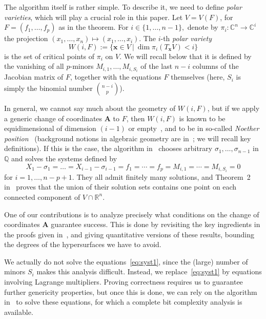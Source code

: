 \documentclass[12pt]{article}
\def\mA{{\bm A}}
\def\xb{{\bm x}}
\def\C{\mathbb{C}}
\def\Q{\mathbb{Q}}
\def\R{\mathbb{R}}
\begin{document}
The algorithm itself is rather simple. To describe it, we need to
define {\em polar varieties}, which will play a crucial role in this
paper. Let $V=V(F)$, for $F=(f_1,\dots,f_p)$ as in the theorem. For $i
\in \{1,\hdots,n-1\},$ denote by $\pi_i:\C^n \rightarrow \C^i$ the
projection $(x_1,\hdots,x_n) \mapsto (x_1,\hdots,x_i)$.  The $i$-th
\textit{polar variety} \[W(i,F) := \{\xb \in V~|~\dim \pi_i(T_\xb
V) < i\}\] is the set of critical points of $\pi_i$ on $V$.  We will
recall below that it is defined by the vanishing of all $p$-minors
$M_{i,1},\dots,M_{i,S_i}$ of the last $n-i$ columns of the Jacobian
matrix of $F$, together with the equations $F$ themselves (here, $S_i$
is simply the binomial number $\binom{n-i}{p}$).

In general, we cannot say much about the geometry of $W(i,F)$, but if
we apply a generic change of coordinates $\mA$ to $F$, then $W(i,F)$
is known to be equidimensional of dimension $(i-1)$ or
empty~\cite{BaGiHeMb97,BaGiHeSaSh10,TWT}, and to be in so-called {\em
  Noether position}~\cite{EMP} (background notions in algebraic
geometry are in~\cite{Mumford76,Shafarevich77,ECA}; we will recall key
definitions). If this is the case, the algorithm in~\cite{EMP} chooses
arbitrary $\sigma_1,\dots,\sigma_{n-1}$ in $\Q$ and solves the systems
defined by
\begin{equation}\label{eq:syst1}
  X_1-\sigma_1 = \dots = X_{i-1}-\sigma_{i-1} = f_1 = \cdots = f_p = M_{i,1} = \cdots = M_{i,S_i} = 0
\end{equation}
for $i=1,\dots,n-p+1$.  They all admit finitely many solutions, and
Theorem~2 in~\cite{EMP} proves that the union of their solution sets
contains one point on each connected component of $V \cap \R^n$.

One of our contributions is to analyze precisely what conditions on
the change of coordinates $\mA$ guarantee success. This is done by
revisiting the key ingredients in the proofs given
in~\cite{BaGiHeSaSh10,EMP}, and giving quantitative versions of these
results, bounding the degrees of the hypersurfaces we have to avoid.

We actually do not solve the equations~\eqref{eq:syst1}, since the
(large) number of minors $S_i$ makes this analysis difficult.  Instead,
we replace~\eqref{eq:syst1} by equations involving Lagrange
multipliers. Proving correctness requires us to guarantee further
genericity properties, but once this is done, we can rely on the algorithm
in~\cite{SH} to solve these equations, for which a complete bit
complexity analysis is available.
\end{document}
